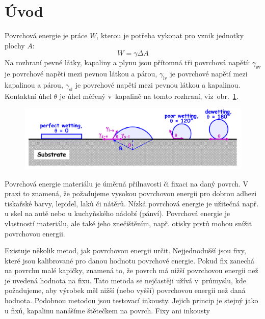 \documentclass{protokol}
\begin{document}
\header
\section{Úvod}
\par Povrchová energie je práce $W$, kterou je potřeba vykonat pro vznik 
jednotky plochy $A$:
\begin{equation}
	W = \gamma\Delta A
\end{equation}
Na rozhraní pevné látky, kapaliny a plynu jsou přítomná tři povrchová napětí: 
$\gamma_{\text{sv}}$ je povrchové napětí mezi pevnou látkou a párou, 
$\gamma_{\text{lv}}$ je 
povrchové napětí mezi kapalinou a párou, $\gamma_{\text{sl}}$ je povrchové 
napětí 
mezi pevnou látkou a kapalinou. Kontaktní úhel $\theta$ je úhel měřený 
v~kapalině na tomto rozhraní, viz~obr.~\ref{wetting}. 
\begin{figure}[b]
	\begin{center}
		\includegraphics[width=\textwidth]{wetting.png}
		\label{wetting}
	\end{center} 
\end{figure}
\par Povrchová energie materiálu je úměrná přilnavosti či fixaci na daný 
povrch. V praxi to znamená, že požadujeme vysokou povrchovou energii pro dobrou 
adhezi tiskařské barvy, lepidel, laků či nátěrů. Nízká povrchová energie je 
užitečná např. u skel na autě nebo u kuchyňského nádobí (pánví). Povrchová 
energie je vlastností materiálu, ale také jeho znečištěním, 
např. otisky prstů mohou snížit povrchovou energii.
\par Existuje několik metod, jak povrchovou energii určit. Nejjednodušší jsou 
fixy, které jsou kalibrované pro danou hodnotu povrchové energie. Pokud fix 
zanechá na povrchu malé kapičky, znamená to, že povrch má nižší povrchovou 
energii než je uvedená hodnota na fixu. Tato metoda se nejčastěji užívá v~průmyslu, kde požadujeme, aby výrobek měl nižší (nebo vyšší) povrchovou energii 
než daná hodnota. Podobnou metodou jsou testovací inkousty. Jejich princip je 
stejný jako u fixů, kapalinu nanášíme štětečkem na povrch. Fixy ani inkousty 
\end{document}
